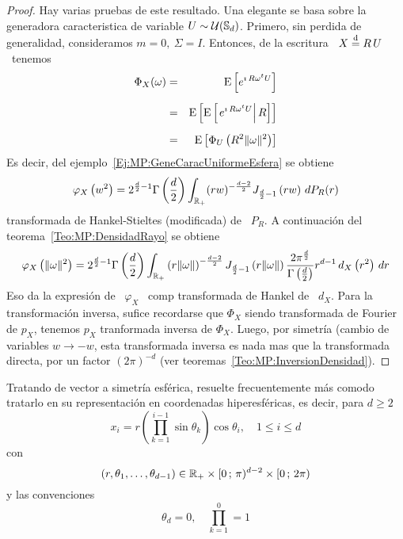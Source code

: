 \begin{proof}
  Hay varias pruebas de este resultado. Una elegante se basa sobre la generadora
  caracteristica  de variable  $U  \sim \mathcal{U}(\mathbb{S}_d)$.  Primero,  sin perdida  de
  generalidad, consideramos $m = 0, \:  \Sigma = I$. Entonces, de la escritura \
  $X \stackrel{\mathrm{d}}{=} R \, U$ \ tenemos
  \begin{eqnarray*}
  \Phi_X(\omega) & = & \operatorname{E}\left[ e^{\imath \, R \omega^t U} \right]\\[2mm]
  & = & \operatorname{E}\left[ \operatorname{E}\left[ \left. e^{\imath \, R \omega^t U} \right| R \right]
  \right]\\[2mm]
  & = & \operatorname{E}\left[ \Phi_U\left( R^2 \| \omega \|^2 \right)  \right]
  \end{eqnarray*}
  Es    decir,    del    ejemplo~\ref{Ej:MP:GeneCaracUniformeEsfera} se obtiene
  \[
  \varphi_X\left(  w^2  \right)  =  2^{\frac{d}{2}-1}  \Gamma\left(
    \frac{d}{2}  \right)  \int_{\mathbb{R}_+}  (r w)^{-
    \frac{d-2}{2}}  J_{\frac{d}{2}-1}  \left( r  w \right)  \, dP_R(r)
  \]
  transformada de Hankel-Stieltes (modificada)  de \ $P_R$. A continuaci\'on del
  teorema~\ref{Teo:MP:DensidadRayo} se obtiene
  \[
  \varphi_X\left(  \|  \omega  \|^2  \right)  =  2^{\frac{d}{2}-1}  \Gamma\left(
    \frac{d}{2}  \right)  \int_{\mathbb{R}_+}  \left(   r  \|  \omega  \|  \right)^{-
    \frac{d-2}{2}}  J_{\frac{d}{2}-1}  \left( r  \|  \omega  \| \right)  \frac{2
    \pi^{\frac{d}{2}}}{\Gamma\left(  \frac{d}{2} \right)}  r^{d-1}  \, d_X\left(
    r^2 \right) \, dr
  \]
  Eso da  la expresi\'on  de \ $\varphi_X$  \ comp  transformada de Hankel  de \
  $d_X$. Para la transformaci\'on inversa, sufice recordarse que $\Phi_X$ siendo
  transformada  de  Fourier  de  $p_X$,  tenemos $p_X$  tranformada  inversa  de
  $\Phi_X$.  Luego,  por  simetr\'ia  (cambio  de variables  $w  \to  -w$,  esta
  transformada inversa  es nada mas que  la transformada directa,  por un factor
  $(2 \pi)^{-d}$ (ver teoremas~\ref{Teo:MP:InversionDensidad}).
\end{proof}

Tratando de  vector a simetr\'ia  esf\'erica, resuelte frecuentemente  m\'as comodo
tratarlo en su representaci\'on en coordenadas hiperesf\'ericas, es decir, para $d
\ge 2$
%
\[
x_i = r \left( \prod_{k=1}^{i-1} \sin\theta_k \right) \cos \theta_i, \quad 1 \le
i \le d
\]
%
con
%
\[
(r,\theta_1,\ldots,\theta_{d-1}) \in \mathbb{R}_+ \times [0 \, ; \, \pi)^{d-2} \times [0 \, ; \, 2 \pi)
\]
%
y las convenciones
%
\[
\theta_d = 0, \quad \prod_{k=1}^{0} = 1
\]

